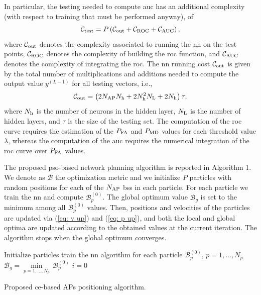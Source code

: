 \documentclass[conference,final]{IEEEtran}
\begin{document}
In particular, the testing needed to compute \ac{auc} has an additional complexity (with respect to training that must be performed anyway), of 
\begin{equation}
    \mathcal{C}_{\rm test} = P \left( \mathcal{C}_{\rm out}+\mathcal{C}_{\rm ROC}+\mathcal{C}_{\rm AUC}\right),
\end{equation}
where  $\mathcal{C}_{\rm out}$ denotes the complexity associated to running the \ac{nn} on the test points, $\mathcal{C}_{\rm ROC}$ denotes the complexity of building the \ac{roc} function, and $\mathcal{C}_{\rm AUC}$ denotes the complexity of integrating the \ac{roc}. The \ac{nn} running cost $\mathcal{C}_{\rm out}$ is given by the total number of multiplications and additions needed to compute the output value $y^{(L-1)}$ for all testing vectors, i.e.,
\begin{equation}
    \mathcal{C}_{\rm out} = \left(2N_{\rm AP}N_{\rm h}+2N_{\rm h}^2N_{\rm L} + 2N_{\rm h}\right)\tau ,
\end{equation}
where $N_{\rm h}$ is the number of neurons in the hidden layer, $N_{\rm L}$ is the number of hidden layers, and $\tau$ is the size of the testing set.
The computation of the \ac{roc} curve requires the estimation of the $P_{\rm FA}$ and $P_{\rm MD}$ values for each threshold value $\lambda$, whereas the computation of the \ac{auc} requires the numerical integration of the \ac{roc} curve over $P_{\rm FA}$ values.

The proposed \ac{pso}-based network planning algorithm is reported in Algorithm 1. We denote as $\mathcal{B}$ the optimization metric and we initialize $P$ particles with random positions for each of the $N_{\rm AP}$ \acp{bs} in each particle. For each particle we train the \ac{nn} and compute $\mathcal{B}_p^{(0)}$. The global optimum value $\mathcal{B}_g$ is set to the minimum among all $\mathcal{B}_p^{(0)}$ values. Then, positions and velocities of the particles are updated via (\ref{eq: v up}) and (\ref{eq: p up}), and both the local and global optima are updated according to the obtained values at the current iteration. The algorithm stops when the global optimum converges.

 \begin{algorithm}[b!]

\small

  Initialize particles\;
  train the \ac{nn} algorithm for each particle\;
  $\mathcal{B}_p^{(0)}$, $p=1,\ldots,N_p$\;
  $\mathcal{B}_g=\underset{p=1,\ldots,N_p}{\min} \, \mathcal{B}_p^{(0)}$\;
  $i = 0$\;

      
\caption{Proposed \ac{ce}-based APs positioning algorithm.}
 \end{algorithm}      
\end{document}
